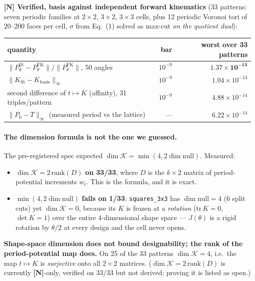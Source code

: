 \documentclass[11pt,a4paper]{article}
\theoremstyle{definition}
\newcommand{\file}[1]{\texttt{\small #1}}
\begin{document}
\textbf{[N] Verified, basis against independent forward kinematics} (33 patterns: seven
periodic families at $2\!\times\!2$, $3\!\times\!2$, $3\!\times\!3$ cells, plus 12 periodic
Voronoi tori of 20--200 faces per cell, $\sigma$ from Eq.~(1) solved as max-cut \emph{on the
quotient dual}):

\begin{center}
\small
\begin{tabular}{@{}lrr@{}}
\toprule
quantity & bar & worst over 33 patterns \\
\midrule
$\|P_\theta^{\mathrm{fit}}-P_\theta^{\mathrm{FK}}\|/\|P_\theta^{\mathrm{FK}}\|$, 50 angles & $10^{-9}$ & $\mathbf{1.37\times10^{-13}}$ \\
$\|K_{\mathrm{fit}}-K_{\mathrm{basis}}\|_\infty$ & $10^{-9}$ & $1.04\times10^{-13}$ \\
second difference of $t\mapsto K$ (affinity), 31 triples/pattern & $10^{-9}$ & $4.88\times10^{-14}$ \\
$\|P_0-T\|_\infty$ (measured period vs the lattice) & --- & $6.22\times10^{-14}$ \\
\bottomrule
\end{tabular}
\end{center}

\paragraph{The dimension formula is not the one we guessed.} The pre-registered spec expected
$\dim\mathcal{K}=\min(4,2\dim\mathrm{null})$. Measured:
\begin{itemize}\itemsep2pt
\item \textbf{$\dim\mathcal{K}=2\,\mathrm{rank}(D)$ on 33/33}, where $D$ is the $k\times2$
matrix of period-potential increments $w_t$. This is the formula, and it is exact.
\item $\min(4,2\dim\mathrm{null})$ \textbf{fails on 1/33}: \file{squares\_3x3} has
$\dim\mathrm{null}=4$ (6 split cuts) yet $\dim\mathcal{K}=0$, because its $K$ is frozen at a
\emph{rotation} ($\mathrm{tr}\,K=0$, $\det K=1$) over the entire 4-dimensional shape space ---
$J(\theta)$ is a rigid rotation by $\theta/2$ at every design and the cell never opens.
\end{itemize}
\textbf{Shape-space dimension does not bound designability; the rank of the period-potential
map does.} On 25 of the 33 patterns $\dim\mathcal{K}=4$, i.e.\ the map $t\mapsto K$ is
\emph{surjective} onto all $2\times2$ matrices. ($\dim\mathcal{K}=2\,\mathrm{rank}(D)$ is
currently \textbf{[N]}-only, verified on 33/33 but not derived; proving it is listed as open.)
\end{document}
